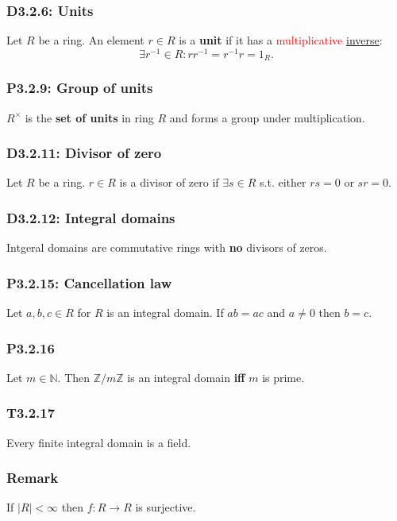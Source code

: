 \documentclass{article}
\begin{document}
\begin{multicols*}{3}
\subsubsection*{D3.2.6: Units}
Let $R$ be a ring. An element $r\in R$
is a \textbf{unit} if it has a
\textcolor{red}{multiplicative} \underline{inverse}:
$$\exists r^{-1}\in R: rr^{-1}=r^{-1}r=1_R.$$

\subsubsection*{P3.2.9: Group of units}
$R^{\times}$ is the \textbf{set of units} in ring $R$
and forms a group under multiplication.

\subsubsection*{D3.2.11: Divisor of zero}
Let $R$ be a ring. $r\in R$ is a divisor of zero
if $\exists s\in R$ s.t. either $rs=0$ or $sr=0$.

\subsubsection*{D3.2.12: Integral domains}
Intgeral domains are commutative rings
with \textbf{no} divisors of zeros.

\subsubsection*{P3.2.15: Cancellation law}
Let $a,b,c\in R$ for $R$ is an integral domain.
If $ab=ac$ and $a\neq0$ then $b=c$.

\subsubsection*{P3.2.16}
Let $m\in\mathbb{N}$. Then $\mathbb{Z}/m\mathbb{Z}$ 
is an integral domain \textbf{if{}f} $m$ is prime.

\subsubsection*{T3.2.17}
Every finite integral domain is a field.

\subsubsection*{Remark}
If $|R|<\infty$ then $f:R\rightarrow R$ is surjective.


\end{multicols*}
\end{document}
